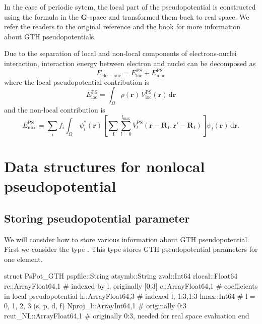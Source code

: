 In the case of periodic sytem, the local part of the pseudopotential
is constructed using the formula in the $\mathbf{G}$-space 
and transformed them back to real space.
We refer the readers to the original
reference \cite{Goedecker1996} and the book \cite{Marx2009}
for more information about GTH pseudopotentials.

Due to the separation of local and non-local components of electrons-nuclei
interaction, interaction energy between electron and nuclei can be decomposed as
\begin{equation}
E_{\mathrm{ele-nuc}} = E^{\mathrm{PS}}_{\mathrm{loc}}
+ E^{\mathrm{PS}}_{\mathrm{nloc}}
\end{equation}
%
where the local pseudopotential contribution is
\begin{equation}
E^{\mathrm{PS}}_{\mathrm{loc}} =
\int_{\Omega} \rho(\mathbf{r})\,V^{\mathrm{PS}}_{\mathrm{loc}}(\mathbf{r})\,
\mathrm{d}\mathbf{r}
\end{equation}
%
and the non-local contribution is
\begin{equation}
E^{\mathrm{PS}}_{\mathrm{nloc}} = 
\sum_{i}
f_{i}
\int_{\Omega}\,
\psi^{*}_{i}(\mathbf{r})
\left[
\sum_{I}\sum_{l=0}^{l_{\mathrm{max}}}
V^{\mathrm{PS}}_{l}(\mathbf{r}-\mathbf{R}_{I},\mathbf{r}'-\mathbf{R}_{I})
\right]
\psi_{i}(\mathbf{r})
\,\mathrm{d}\mathbf{r}.
\end{equation}

\section{Data structures for nonlocal pseudopotential}

\subsection{Storing pseudopotential parameter}

We will consider how to store various information about GTH pseudopotential.
First we consider the type . This type stores GTH pseudopotential
parameters for one element.

\begin{juliacode}
struct PsPot_GTH
  pspfile::String
  atsymb::String
  zval::Int64
  rlocal::Float64
  rc::Array{Float64,1}  # indexed by l, originally [0:3]
  c::Array{Float64,1}   # coefficients in local pseudopotential
  h::Array{Float64,3}   # indexed l, 1:3,1:3
  lmax::Int64           # l = 0, 1, 2, 3 (s, p, d, f)
  Nproj_l::Array{Int64,1}  # originally 0:3
  rcut_NL::Array{Float64,1}  # originally 0:3, needed for real space evaluation
end
\end{juliacode}

